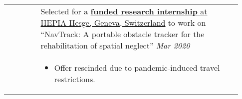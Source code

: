 \documentclass[letterpaper, 10pt, oneside]{article}
\begin{document}
\begin{longtable}{@{} p{0.13\linewidth} p{0.8\linewidth}}
                         & Selected for a \href{https://drive.google.com/file/d/1Rtlu6aHQKXntWhfEUcgB5tuNYMuvH04b}{\textbf{funded research internship} at HEPIA-Hesge, Geneva, Switzerland}
    to work on ``NavTrack: A portable obstacle tracker for the rehabilitation of spatial neglect''           \hfill \textsl{Mar 2020}                                                                                                        \\
                         & \parbox{0.8\textwidth}{                                                                                                                                                                                           %
        \begin{itemize}[leftmargin=6ex, itemsep=-0.88ex, topsep=-0.88ex]
            \item Offer rescinded due to pandemic-induced travel restrictions. \\
        \end{itemize}
    }
\end{longtable}
\end{document}
